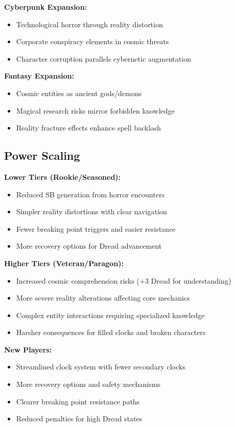 \documentclass[11pt]{article}
\begin{document}
\textbf{Cyberpunk Expansion:}
\begin{itemize}
\item Technological horror through reality distortion
\item Corporate conspiracy elements in cosmic threats
\item Character corruption parallels cybernetic augmentation
\end{itemize}

\textbf{Fantasy Expansion:}
\begin{itemize}
\item Cosmic entities as ancient gods/demons
\item Magical research risks mirror forbidden knowledge
\item Reality fracture effects enhance spell backlash
\end{itemize}

\subsection{Power Scaling}

\textbf{Lower Tiers (Rookie/Seasoned):}
\begin{itemize}
\item Reduced SB generation from horror encounters
\item Simpler reality distortions with clear navigation
\item Fewer breaking point triggers and easier resistance
\item More recovery options for Dread advancement
\end{itemize}

\textbf{Higher Tiers (Veteran/Paragon):}
\begin{itemize}
\item Increased cosmic comprehension risks (+3 Dread for understanding)
\item More severe reality alterations affecting core mechanics
\item Complex entity interactions requiring specialized knowledge
\item Harsher consequences for filled clocks and broken characters
\end{itemize}

\textbf{New Players:}
\begin{itemize}
\item Streamlined clock system with fewer secondary clocks
\item More recovery options and safety mechanisms
\item Clearer breaking point resistance paths
\item Reduced penalties for high Dread states
\end{itemize}
\end{document}
